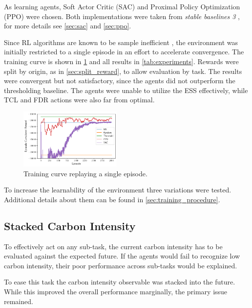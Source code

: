 As learning agents, Soft Actor Critic (SAC) \cite{Haarnoja.04.01.2018} and Proximal Policy Optimization (PPO) \cite{Schulman.20.07.2017} were chosen. Both implementations were taken from \textit{stable baselines 3} \cite{AntoninRaffin.2021}, for more details see \cref{sec:sac} and \cref{sec:ppo}.
\par
Since RL algorithms are known to be sample inefficient \cite{rlblogpost}, the environment was initially restricted to a single episode in an effort to accelerate convergence. The training curve is shown in \cref{fig:training_curve} and all results in \cref{tab:experiments}. Rewards were split by origin, as in \cref{sec:split_reward}, to allow evaluation by task. The results were convergent but not satisfactory, since the agents did not outperform the thresholding baseline. The agents were unable to utilize the ESS effectively, while TCL and FDR actions were also far from optimal.
\begin{figure}[H]
    \centering
    \setlength{\abovecaptionskip}{0pt}
    \includegraphics[width=0.45\textwidth]{figures/training_curve.png}
    \caption{Training curve replaying a single episode.}
    \label{fig:training_curve}
\end{figure}
To increase the learnability of the environment three variations were tested. Additional details about them can be found in \cref{sec:training_procedure}.


\subsection{Stacked Carbon Intensity}
To effectively act on any sub-task, the current carbon intensity has to be evaluated against the expected future. If the agents would fail to recognize low carbon intensity, their poor performance across sub-tasks would be explained.
\par
To ease this task the carbon intensity observable was stacked into the future.  While this improved the overall performance marginally, the primary issue remained.


